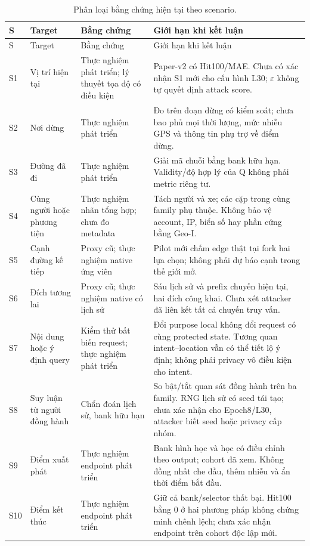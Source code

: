 \begingroup
\small
\setlength{\tabcolsep}{4pt}
\begin{longtable}{P{0.7cm}P{3.4cm}P{3.0cm}P{7.3cm}}
\caption{Phân loại bằng chứng hiện tại theo scenario.}\label{tab:current-scenario-coverage}\\
\toprule S & Target & Bằng chứng & Giới hạn khi kết luận \\\midrule
\endfirsthead
\toprule S & Target & Bằng chứng & Giới hạn khi kết luận \\\midrule
\endhead
S1 & Vị trí hiện tại & Thực nghiệm phát triển; lý thuyết tọa độ có điều kiện &
Paper-v2 có Hit100/MAE. Chưa có xác nhận S1 mới cho cấu hình L30; $\varepsilon$ không tự quyết định attack score. \\
S2 & Nơi dừng & Thực nghiệm phát triển &
Đo trên đoạn dừng có kiểm soát; chưa bao phủ mọi thời lượng, mức nhiễu GPS và thông tin phụ trợ về điểm dừng. \\
S3 & Đường đã đi & Thực nghiệm phát triển &
Giải mã chuỗi bằng bank hữu hạn. Validity/độ hợp lý của Q không phải metric riêng tư. \\
S4 & Cùng người hoặc phương tiện & Thực nghiệm nhãn tổng hợp; chưa đo metadata &
Tách người và xe; các cặp trong cùng family phụ thuộc. Không bảo vệ account, IP, biển số hay phần cứng bằng Geo-I. \\
S5 & Cạnh đường kế tiếp & Proxy cũ; thực nghiệm native ứng viên &
Pilot mới chấm edge thật tại fork hai lựa chọn; không phải dự báo cạnh trong thế giới mở. \\
S6 & Đích tương lai & Proxy cũ; thực nghiệm native có lịch sử &
Sáu lịch sử và prefix chuyến hiện tại, hai đích công khai. Chưa xét attacker đã liên kết tất cả chuyến truy vấn. \\
S7 & Nội dung hoặc ý định query & Kiểm thử bất biến request; thực nghiệm phát triển &
Đổi purpose local không đổi request có cùng protected state. Tương quan intent--location vẫn có thể tiết lộ ý định; không phải privacy vô điều kiện cho intent. \\
S8 & Suy luận từ người đồng hành & Chẩn đoán lịch sử, bank hữu hạn &
So bật/tắt quan sát đồng hành trên ba family. RNG lịch sử có seed tái tạo; chưa xác nhận cho Epoch8/L30, attacker biết seed hoặc privacy cấp nhóm. \\
S9 & Điểm xuất phát & Thực nghiệm endpoint phát triển &
Bank hình học và học có điều chỉnh theo output; cohort đã xem. Không đồng nhất che đầu, thêm nhiễu và ẩn thời điểm bắt đầu. \\
S10 & Điểm kết thúc & Thực nghiệm endpoint phát triển &
Giữ cả bank/selector thất bại. Hit100 bằng 0 ở hai phương pháp không chứng minh chênh lệch; chưa xác nhận endpoint trên cohort độc lập mới. \\
\bottomrule
\end{longtable}
\endgroup

